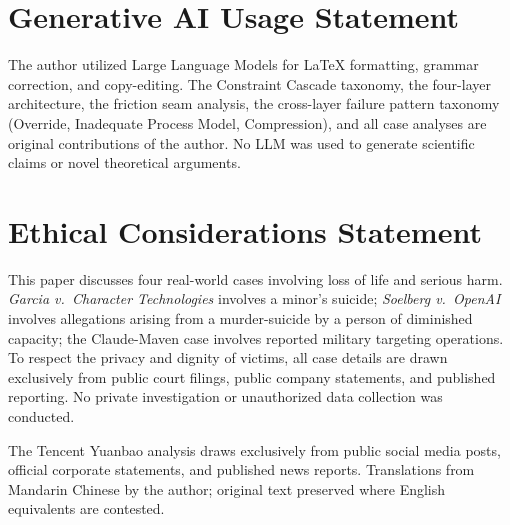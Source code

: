 \section*{Generative AI Usage Statement}

The author utilized Large Language Models for \LaTeX{} formatting, grammar correction, and copy-editing. The Constraint Cascade taxonomy, the four-layer architecture, the friction seam analysis, the cross-layer failure pattern taxonomy (Override, Inadequate Process Model, Compression), and all case analyses are original contributions of the author. No LLM was used to generate scientific claims or novel theoretical arguments.

\section*{Ethical Considerations Statement}

This paper discusses four real-world cases involving loss of life and serious harm. \emph{Garcia v.\ Character Technologies} involves a minor's suicide; \emph{Soelberg v.\ OpenAI} involves allegations arising from a murder-suicide by a person of diminished capacity; the Claude-Maven case involves reported military targeting operations. To respect the privacy and dignity of victims, all case details are drawn exclusively from public court filings, public company statements, and published reporting. No private investigation or unauthorized data collection was conducted.

The Tencent Yuanbao analysis draws exclusively from public social media posts, official corporate statements, and published news reports. Translations from Mandarin Chinese by the author; original text preserved where English equivalents are contested.
